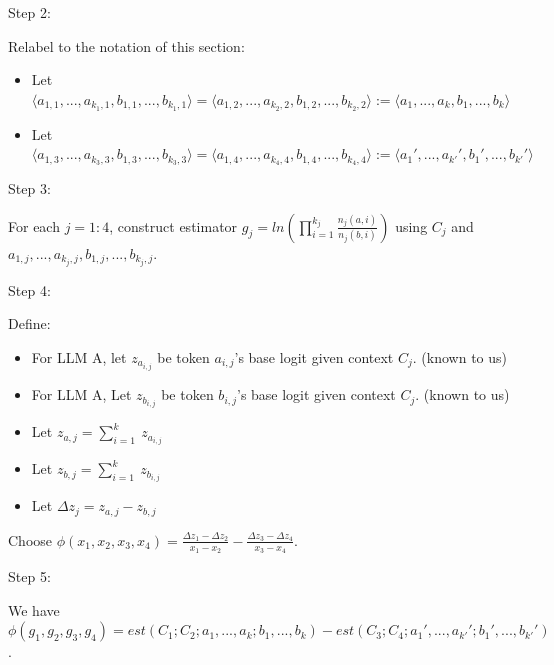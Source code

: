 \documentclass{article}
\begin{document}
Step 2:

Relabel to the notation of this section:
\begin{itemize}
\item Let $\displaystyle \langle a_{1,1} ,...,a_{k_{1} ,1} ,b_{1,1} ,...,b_{k_{1} ,1} \rangle =\langle a_{1,2} ,...,a_{k_{2} ,2} ,b_{1,2} ,...,b_{k_{2} ,2} \rangle :=\langle a_{1} ,...,a_{k} ,b_{1} ,...,b_{k} \rangle $
\item Let $\displaystyle \langle a_{1,3} ,...,a_{k_{3} ,3} ,b_{1,3} ,...,b_{k_{3} ,3} \rangle =\langle a_{1,4} ,...,a_{k_{4} ,4} ,b_{1,4} ,...,b_{k_{4} ,4} \rangle :=\langle a_{1} ',...,a_{k'} ',b_{1} ',...,b_{k'} '\rangle $
\end{itemize}



Step 3:

For each $\displaystyle j=1:4$, construct estimator $\displaystyle g_{j} =ln\left(\prod _{i=1}^{k_{j}}\frac{n_{j}\left( a,i\right)}{n_{j}\left( b,i\right)}\right)$ using $\displaystyle C_{j}$ and $\displaystyle a_{1,j} ,...,a_{k_{j} ,j} ,b_{1,j} ,...,b_{k_{j} ,j}$.



Step 4:

Define:
\begin{itemize}
\item For LLM A, let $\displaystyle z_{a_{i,j}}$ be token $\displaystyle a_{i,j}$'s base logit given context $\displaystyle C_{j}$. (known to us)
\item For LLM A, Let $\displaystyle z_{b_{i,j}}$ be token $\displaystyle b_{i,j}$'s base logit given context $\displaystyle C_{j}$. (known to us)
\item Let $\displaystyle z_{a,j} =\sum _{i=1}^{k} \ z_{a_{i,j}}$
\item Let $\displaystyle z_{b,j} =\sum _{i=1}^{k} \ z_{b_{i,j}}$
\item Let $\displaystyle \Delta z_{j} =z_{a,j} -z_{b,j}$
\end{itemize}

Choose $\displaystyle \phi \left( x_{1} ,x_{2} ,x_{3} ,x_{4}\right) =\frac{\Delta z_{1} -\Delta z_{2}}{x_{1} -x_{2}} -\frac{\Delta z_{3} -\Delta z_{4}}{x_{3} -x_{4}}$.



Step 5:

We have $\displaystyle \phi \left( g_{1} ,g_{2} ,g_{3} ,g_{4}\right) =est\left( C_{1} ;C_{2} ;a_{1} ,...,a_{k} ;b_{1} ,...,b_{k}\right) -est\left( C_{3} ;C_{4} ;a_{1} ',...,a_{k'} ';b_{1} ',...,b_{k'} '\right)$.
\end{document}

